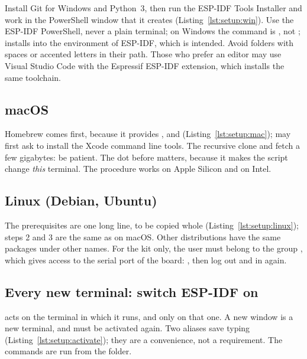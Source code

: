 Install Git for Windows and Python~3, then run the ESP-IDF Tools Installer and
work in the PowerShell window that it creates
(Listing~\ref{lst:setup:win}). Use the ESP-IDF PowerShell, never a plain
terminal; on Windows the command is , not ;
 installs into the environment of ESP-IDF, which is intended. Avoid
folders with spaces or accented letters in their path. Those who prefer an
editor may use Visual Studio Code with the Espressif ESP-IDF extension, which
installs the same toolchain.


\subsection{macOS}

Homebrew comes first, because it provides ,  and
 (Listing~\ref{lst:setup:mac});  may first ask to
install the Xcode command line tools. The recursive clone and
 fetch a few gigabytes: be patient. The dot before
 matters, because it makes the script change \emph{this}
terminal. The procedure works on Apple Silicon and on Intel.


\subsection{Linux (Debian, Ubuntu)}

The prerequisites are one long  line, to be copied whole
(Listing~\ref{lst:setup:linux}); steps 2 and 3 are the same as on macOS. Other
distributions have the same packages under other names. For the kit only, the
user must belong to the group , which gives access to the serial
port of the board: , then log out and in
again.


\subsection{Every new terminal: switch ESP-IDF on}

 acts on the terminal in which it runs, and only on that one.
A new window is a new terminal, and must be activated again. Two aliases save
typing (Listing~\ref{lst:setup:activate}); they are a convenience, not a
requirement. The  commands are run from the \prg folder.


